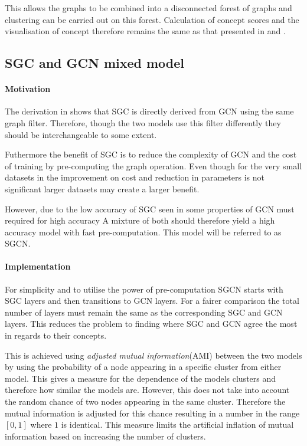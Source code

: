 This allows the graphs to be combined into a disconnected forest of graphs and clustering can be carried out on this forest.
Calculation of concept scores and the visualisation of concept therefore remains the same as that presented in  and .

\subsection{SGC and GCN mixed model}
\label{sec:SGCN}
\paragraph{Motivation}
The derivation in  shows that SGC is directly derived from GCN using the same graph filter.
Therefore, though the two models use this filter differently they should be interchangeable to some extent.

Futhermore the benefit of SGC is to reduce the complexity of GCN and the cost of training by pre-computing the graph operation.
Even though for the very small datasets in  the improvement on cost and reduction in parameters is not significant larger datasets may create a larger benefit.

However, due to the low accuracy of SGC seen in  some properties of GCN must required for high accuracy 
A mixture of both should therefore yield a high accuracy model with fast pre-computation.
This model will be referred to as SGCN.

\paragraph{Implementation}
For simplicity and to utilise the power of pre-computation SGCN starts with SGC layers and then transitions to GCN layers.
For a fairer comparison the total number of layers must remain the same as the corresponding SGC and GCN layers.
This reduces the problem to finding where SGC and GCN agree the most in regards to their concepts.

This is achieved using \emph{adjusted mutual information}(AMI) between the two models by using the probability of a node appearing in a specific cluster from either model.
This gives a measure for the dependence of the models clusters and therefore how similar the models are.
However, this does not take into account the random chance of two nodes appearing in the same cluster.
Therefore the mutual information is adjusted for this chance resulting in a number in the range $[0, 1]$ where $1$ is identical.
This measure limits the artificial inflation of mutual information based on increasing the number of clusters.

